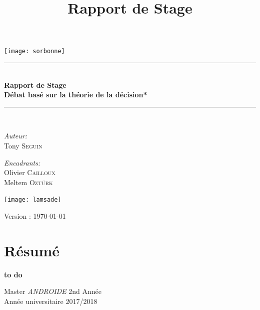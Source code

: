 \documentclass[a4paper, 11pt]{article}
\title{Rapport de Stage}
\renewcommand{\textbf}[1]{\begingroup\bfseries\mathversion{bold}#1\endgroup}
\newcommand{\HRule}{\rule{\linewidth}{0.3mm}}
\begin{document}
\begin{titlepage}
\begin{center}
	\texttt{[image: sorbonne]}~\\[0.5cm]
	\HRule \\[0.4cm]

	{\huge \bfseries Rapport de Stage\\ \LARGE
		Débat basé sur la théorie de la décision* \\[0.5cm] } 

	\HRule \\[1.0cm]

	\begin{minipage}{0.5\textwidth}
		\begin{flushleft} \large
			\emph{Auteur:}\\
            Tony \textsc{Seguin}\\
		\end{flushleft}
        \begin{flushleft}
        	\emph{Encadrants:}\\
            Olivier \textsc{Cailloux}\\
            Meltem \textsc{Oztürk}\\
            


            
        \end{flushleft}
	\end{minipage}
\end{center}
\begin{center}
	\texttt{[image: lamsade]}~\\[0.5cm]
\end{center}






Version : \today

\section*{Résumé}
	\textbf{to do}

	\vfill
\begin{center}
	{\Large Master \textit{ANDROIDE} 2nd Année\\[0.1cm]}
	{Année universitaire 2017/2018}
\end{center}
\end{titlepage}
\end{document}
